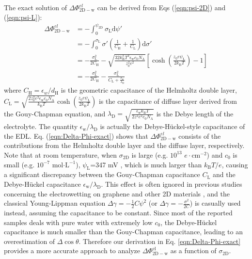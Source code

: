 \documentclass[aps,prl,reprint,groupedaddress,amsmath,amssymb, showpacs]{revtex4-1}
\begin{document}
The exact solution of \(\Delta
\Phi_{\mathrm{2D-w}}^{el}\) can be derived from Eqs (\ref{eqn:psi-2D})
and (\ref{eqn:psi-L}):
\begin{equation}
\label{eqn:Delta-Phi-exact}
\begin{aligned}
\Delta \Phi_{\mathrm{2D-w}}^{el}
&= -\int_{0}^{\psi_{\mathrm{2D}}} \sigma_{\mathrm{L}} \mathrm{d}\psi' \\
&= -\int_{0}^{\sigma_{\mathrm{L}}} \sigma'\left(
   \frac{1}{C_{\mathrm{H}}} + \frac{1}{C_{\mathrm{L}}}
                                          \right) \mathrm{d}\sigma' \\
&= -\frac{\sigma_{\mathrm{L}}^{2}}{2C_{\mathrm{H}}}
    -\sqrt{\frac{32k_{\mathrm{B}}^{3}T^{3} \epsilon_{\mathrm{w}} c_{0} N_{\mathrm{A}}}{z_{0}^{2}e^{2}}}
   \left[\cosh(\frac{z_{0}e\psi_{\mathrm{L}}}{2k_{\mathrm{B}}T}) - 1\right] \\
&= -\frac{\sigma_{\mathrm{L}}^{2}}{2C_{\mathrm{H}}} 
   - \frac{\sigma_{\mathrm{L}}^{2}}{C_{\mathrm{L}} 
   + \frac{\epsilon_{w}}{\lambda_{\mathrm{D}}}}
\end{aligned}
\end{equation}
where \(C_{\mathrm{H}}=\epsilon_{w}/d_{\mathrm{H}}\) is the geometric
capacitance of the Helmholtz double layer,
\(C_{\mathrm{L}}=\sqrt{\frac{2z_{0}^{2}e^{2}\epsilon_{\mathrm{w}}c_{0}N_{\mathrm{A}}}{k_{\mathrm{B}}T}}
\cosh (\frac{z_{0}e\psi_{\mathrm{L}}}{2k_{\mathrm{B}}T})\) is the
capacitance of diffuse layer derived from the Gouy-Chapman equation,
and
\(\lambda_{\mathrm{D}}=\sqrt{\frac{\epsilon_{\mathrm{w}}k_{\mathrm{B}}T}{2z^{2}e^{2}c_{0}N_{\mathrm{A}}}}\)
is the Debye length of the electrolyte. The quantity
\(\epsilon_{\mathrm{w}}/\lambda_{\mathrm{D}}\) is actually the
Debye-Hückel-style capacitance of the EDL.
Eq. (\ref{eqn:Delta-Phi-exact}) shows that \(\Delta
\Phi_{\mathrm{2D-w}}^{el}\) consists of the contributions from the
Helmholtz double layer and the diffuse layer, respectively.  Note that
at room temperature, when \(\sigma_{\mathrm{2D}}\) is large
(e.g. \(10^{13}\) \(e\cdot \mathrm{cm}^{-2}\)) and \(c_{0}\) is small
(e.g. \(10^{-7}\) mol\(\cdot \mathrm{L}^{-1}\)),
\(\psi_{\mathrm{L}}\)=347 mV
, which is much larger than \(k_{\mathrm{B}}T/e\), causing a significant
discrepancy between the Gouy-Chapman capacitance \(C_{\mathrm{L}}\) and
the Debye-Hückel capacitance
\(\epsilon_{\mathrm{w}}/\lambda_{\mathrm{D}}\). This effect is often
ignored in previous studies concerning the electrowetting on graphene
and other 2D materials
\cite{ostrowski_tunable_2014,daub_electrowetting_2007,goniszewski_correlation_2016,ashraf_doping-induced_2016},
and the classical Young-Lippman equation \(\Delta
\gamma=-\frac{1}{2}C\psi^{2}\) (or \(\Delta
\gamma=-\frac{\sigma^{2}}{2C}\)) is casually used instead, assuming the
capacitance to be constant. Since most of the reported samples deals with pure water with extremely low \(c_{0}\), the Debye-Hückel capacitance is much smaller than the Gouy-Chapman capacitance, leading to an overestimation of \(\Delta\cos\theta\). Therefore our
derivation in Eq. \ref{eqn:Delta-Phi-exact} provides a more accurate
approach to analyze \(\Delta \Phi_{\mathrm{2D-w}}^{\mathrm{el}}\) as a function of \(\sigma_{\mathrm{2D}}\).
\end{document}
